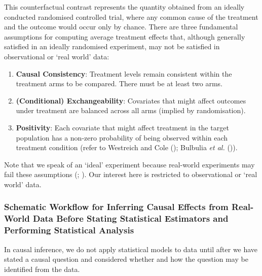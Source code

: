 \documentclass[
  single column]{article}
\providecommand{\tightlist}{%
  \setlength{\itemsep}{0pt}\setlength{\parskip}{0pt}}\usepackage{longtable,booktabs,array}
\begin{document}
This counterfactual contrast represents the quantity obtained from an
ideally conducted randomised controlled trial, where any common cause of
the treatment and the outcome would occur only by chance. There are
three fundamental assumptions for computing average treatment effects
that, although generally satisfied in an ideally randomised experiment,
may not be satisfied in observational or `real world' data:

\begin{enumerate}
\def\labelenumi{\arabic{enumi}.}
\tightlist
\item
  \textbf{Causal Consistency}: Treatment levels remain consistent within
  the treatment arms to be compared. There must be at least two arms.
\item
  \textbf{(Conditional) Exchangeability}: Covariates that might affect
  outcomes under treatment are balanced across all arms (implied by
  randomisation).
\item
  \textbf{Positivity}: Each covariate that might affect treatment in the
  target population has a non-zero probability of being observed within
  each treatment condition (refer to Westreich and Cole
  (); Bulbulia \emph{et al.}
  ()).
\end{enumerate}

Note that we speak of an `ideal' experiment because real-world
experiments may fail these assumptions
(;
). Our interest
here is restricted to observational or `real world' data.

\subsubsection{Schematic Workflow for Inferring Causal Effects from
Real-World Data Before Stating Statistical Estimators and Performing
Statistical
Analysis}\label{schematic-workflow-for-inferring-causal-effects-from-real-world-data-before-stating-statistical-estimators-and-performing-statistical-analysis}

In causal inference, we do not apply statistical models to data until
after we have stated a causal question and considered whether and how
the question may be identified from the data.
\end{document}

